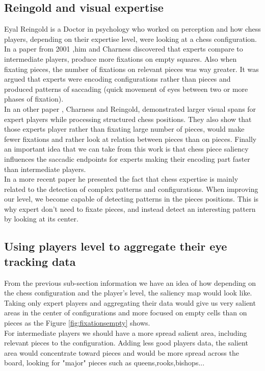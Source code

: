\subsection{Reingold and visual expertise}
Eyal Reingold is a Doctor in psychology who worked on perception and how chess players, depending on their expertise level, were looking at a chess configuration. In a paper from 2001 \cite{Charness2001},him and Charness discovered that experts compare to intermediate players, produce more fixations on empty squares. Also when fixating pieces, the number of fixations on relevant pieces was way greater. It was argued that experts were encoding configurations rather than pieces and produced patterns of saccading (quick movement of eyes between two or more phases of fixation).\\
In an other paper \cite{Perceptioninchess}, Charness and Reingold, demonstrated larger visual spans for expert players while processing structured chess positions. They also show that those experts player rather than fixating large number of pieces, would make fewer fixations and rather look at relation between pieces than on pieces. Finally an important idea that we can take from this work is that chess piece saliency influences the saccadic endpoints for experts making their encoding part faster than  intermediate players.\\
In a more recent paper  \cite{doi:10.1167/17.3.4} he presented the fact that chess expertise is mainly related to the detection of complex patterns and configurations. When improving our level, we become capable of detecting patterns in the pieces positions. This is why expert don't need to fixate pieces, and instead detect an interesting pattern by looking at its center.

\subsection{Using players level to aggregate their eye tracking data}
From the previous sub-section information we have an idea of how depending on the chess configuration and the player's level, the saliency map would look like. Taking only expert players and aggregating their data would give us very salient areas in the center of configurations and more focused on empty cells than on pieces as the Figure \ref{fig:fixationsempty} shows.\\
For intermediate players we should have a more spread salient area, including relevant pieces to the configuration. Adding less good players data, the salient area would concentrate toward pieces and would be more spread across the board, looking for "major" pieces such as queens,rooks,bishops...\\

